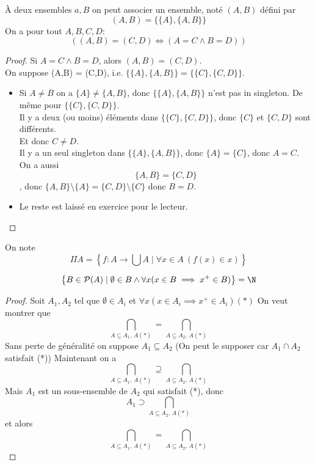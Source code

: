 \begin{prop}
	À deux ensembles $a, B$ on peut associer un ensemble, noté $(A,B)$ défini par
	$$ (A,B) = \{ \{A\}, \{A,B\} \}$$
	On a pour tout $A, B, C, D$:
	$$ \left((A, B) = (C,D) \iff (A = C \land B = D)\right)$$
\end{prop}

\begin{proof}
	Si $A = C \land B = D$, alors $(A,B) = (C,D)$.\\
	On suppose (A,B) = (C,D), i.e. $\{\{A\}, \{A,B\}\} = \{\{C\}, \{C,D\}\}$.\\

	\begin{itemize}
		\item Si $A \neq B$ on a $\{A\} \neq \{A,B\}$, donc $\{\{A\}, \{A,B\}\}$ n'est pas in singleton.
		      De même pour $\{\{C\}, \{C,D\}\}$.\\
		      Il y a deux (ou moins) éléments dans $\{\{C\}, \{C,D\}\}$, donc $\{C\}$ et  $\{C,D\}$ sont différents.\\
		      Et donc $C \neq D$. \\
		      Il y a un seul singleton dans $\{\{A\}, \{A,B\}\}$, donc $\{A\} = \{C\}$, donc $A = C$.\\
		      On a aussi $$\{A,B\} = \{C,D\}$$, donc $\{A, B\}\setminus \{A\} = \{C,D\}\setminus \{C\}$ donc $B = D$.
		\item Le reste est laissé en exercice pour le lecteur.
	\end{itemize}
\end{proof}


On note
$$ \Pi A = \left\{ f: A \to \bigcup A \mid \forall x \in A \ (f(x) \in x) \right\}$$


\begin{prop}
	$$ \left\{ B \in \mathcal{P}(A) \mid \emptyset \in B \land \forall x (x \in B \implies x^+ \in B) \right\} = \N $$
\end{prop}

\begin{proof}
	Soit $A_1, A_2$ tel que $\emptyset \in A_i$ et
	$ \forall x (x \in A_i \implies x^+ \in A_i) (*)$
	On veut montrer que
	$$ \bigcap_{A\subseteq A_1, \, A (*)} = \bigcap_{A\subseteq A_2, \, A(*)} $$
	Sans perte de généralité on suppose $A_1 \subseteq A_2$ (On peut le supposer car
	$A_1 \cap A_2$ satisfait (*))
	Maintenant on a
	$$ \bigcap_{A\subseteq A_1, \, A (*)} \supseteq \bigcap_{A\subseteq A_2, \, A(*)} $$
	Mais $A_1$ est un sous-ensemble de $A_2$ qui satisfait (*), donc
	$$A_1 \supset \bigcap_{A\subseteq A_2, \, A(*)} $$
	et alors
	$$ \bigcap_{A\subseteq A_1, \, A (*)} = \bigcap_{A\subseteq A_2, \, A(*)} $$
\end{proof}


